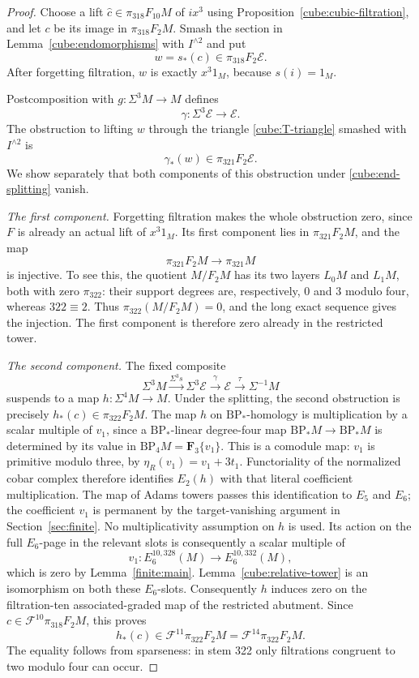 \documentclass[11pt]{article}
\theoremstyle{definition}
\theoremstyle{remark}
\numberwithin{equation}{section}
\begin{document}
\begin{proof}
Choose a lift
\(\widehat c\in\pi_{318}F_{10}M\) of \(ix^3\) using
Proposition~\ref{cube:cubic-filtration}, and let \(c\)
be its image in \(\pi_{318}F_2M\).  Smash the section
in Lemma~\ref{cube:endomorphisms} with \(I^{\wedge2}\)
and put
\[
 w=s_*(c)\in\pi_{318}F_2\mathcal E.
\]
After forgetting filtration, \(w\) is exactly
\(x^3 1_M\), because \(s(i)=1_M\).

Postcomposition with \(g:\Sigma^3M\to M\) defines
\[
 \gamma:\Sigma^3\mathcal E\longrightarrow\mathcal E.
\]
The obstruction to lifting \(w\) through the triangle
\eqref{cube:T-triangle} smashed with \(I^{\wedge2}\)
is
\[
 \gamma_*(w)\in\pi_{321}F_2\mathcal E.
\]
We show separately that both components of this
obstruction under \eqref{cube:end-splitting} vanish.

\emph{The first component.}
Forgetting filtration makes the whole obstruction
zero, since \(F\) is already an actual lift of
\(x^3 1_M\).  Its first component lies in
\(\pi_{321}F_2M\), and the map
\[
 \pi_{321}F_2M\longrightarrow\pi_{321}M
\]
is injective.  To see this, the quotient \(M/F_2M\)
has its two layers \(L_0M\) and \(L_1M\), both with
zero \(\pi_{322}\): their support degrees are,
respectively, \(0\) and \(3\) modulo four, whereas
\(322\equiv2\).  Thus \(\pi_{322}(M/F_2M)=0\), and
the long exact sequence gives the injection.
The first component is therefore zero already in
the restricted tower.

\emph{The second component.}
The fixed composite
\[
 \Sigma^3M\xrightarrow{\Sigma^3s}\Sigma^3\mathcal E
     \xrightarrow{\gamma}\mathcal E
     \xrightarrow{\tau}\Sigma^{-1}M
\]
suspends to a map \(h:\Sigma^4M\to M\).
Under the splitting, the second obstruction is
precisely \(h_*(c)\in\pi_{322}F_2M\).
The map \(h\) on \(\mathrm{BP}_*\)-homology is multiplication
by a scalar multiple of \(v_1\), since a
\(\mathrm{BP}_*\)-linear degree-four map
\(\mathrm{BP}_*M\to\mathrm{BP}_*M\) is determined by its value in
\(\mathrm{BP}_4M=\mathbf F_3\{v_1\}\).
This is a comodule map: \(v_1\) is primitive modulo three,
by \(\eta_R(v_1)=v_1+3t_1\).
Functoriality of the normalized cobar complex therefore
identifies \(E_2(h)\) with that literal coefficient
multiplication.  The map of Adams towers passes this
identification to \(E_5\) and \(E_6\); the coefficient
\(v_1\) is permanent by the target-vanishing argument in
Section~\ref{sec:finite}.
No multiplicativity assumption on \(h\) is used.
Its action on the full \(E_6\)-page in the
relevant slots is consequently a scalar multiple of
\begin{equation}\label{cube:v-obstruction}
 v_1:E_6^{10,328}(M)\longrightarrow E_6^{10,332}(M),
\end{equation}
which is zero by Lemma~\ref{finite:main}.
Lemma~\ref{cube:relative-tower} is an isomorphism on
both these \(E_6\)-slots.  Consequently \(h\) induces
zero on the filtration-ten associated-graded map
of the restricted abutment.  Since
\(c\in\mathcal F^{10}\pi_{318}F_2M\), this proves
\[
 h_*(c)\in\mathcal F^{11}\pi_{322}F_2M
          =\mathcal F^{14}\pi_{322}F_2M.
\]
The equality follows from sparseness: in stem 322
only filtrations congruent to two modulo four can
occur.


\end{proof}
\end{document}
